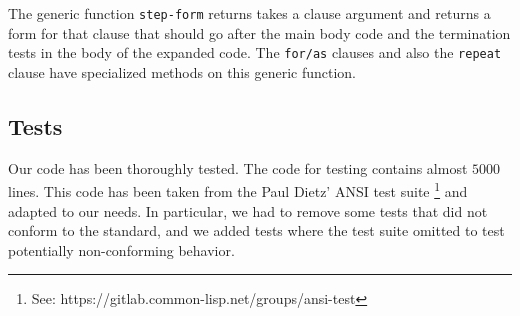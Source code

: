 The generic function \texttt{step-form} returns takes a clause
argument and returns a form for that clause that should go after the
main body code and the termination tests in the body of the expanded
code.  The \texttt{for/as} clauses and also the \texttt{repeat} clause
have specialized methods on this generic function.

\subsection{Tests}
\label{sec-our-technique-tests}

Our code has been thoroughly tested.  The code for testing contains
almost $5000$ lines.  This code has been taken from the Paul Dietz'
ANSI test suite%
\footnote{See: https://gitlab.common-lisp.net/groups/ansi-test}
and adapted to our needs.  In particular, we had to remove some tests
that did not conform to the standard, and we added tests where the
test suite omitted to test potentially non-conforming behavior.
